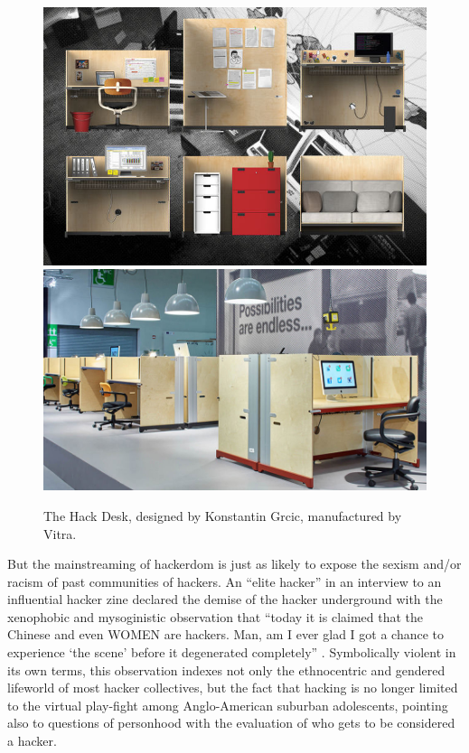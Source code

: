 \documentclass[10pt,letter,oneside]{scrartcl}
\begin{document}


\begin{figure} \centering
\includegraphics[scale=0.4]{images/Workspirit13HACKStudioAKFB3}
\includegraphics[scale=0.25]{images/HackDeskGrcic} \caption{The Hack Desk,
  designed by Konstantin Grcic, manufactured by Vitra.}
\label{fig:hackdeskimage}
\end{figure}

But the mainstreaming of hackerdom is just as likely to expose the sexism
and/or racism of past communities of hackers.  An ``elite hacker'' in an
interview to an influential hacker zine declared the demise of the hacker
underground with the xenophobic and mysoginistic observation that ``today it
is claimed that the Chinese and even WOMEN are hackers. Man, am I ever glad I
got a chance to experience `the scene' before it degenerated completely''
\parencite{phrackmag_2016}.  Symbolically violent in its own terms, this
observation indexes not only the ethnocentric and gendered lifeworld of most
hacker collectives, but the fact that hacking is no longer limited to the
virtual play-fight among Anglo-American suburban adolescents, pointing also to
questions of personhood with the evaluation of who gets to be considered a
hacker.
\end{document}
